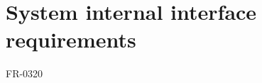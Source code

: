 \section{System internal interface requirements}

\begin{description}
  \item[FR-0320] 

\end{description}